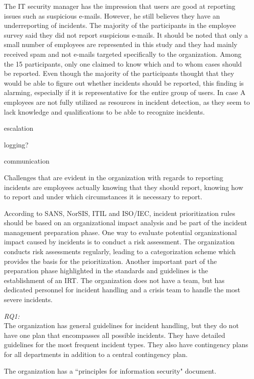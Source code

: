 The IT security manager has the impression that users are good at reporting issues such as suspicious e-mails. However, he still believes they have an underreporting of incidents. The majority of the participants in the employee survey said they did not report suspicious e-mails. It should be noted that only a small number of employees are represented in this study and they had mainly received spam and not e-mails targeted specifically to the organization. Among the 15 participants, only one claimed to know which and to whom cases should be reported. Even though the majority of the participants thought that they would be able to figure out whether incidents should be reported, this finding is alarming, especially if it is representative for the entire group of users. In case A employees are not fully utilized as resources in incident detection, as they seem to lack knowledge and qualifications to be able to recognize incidents.

escalation

logging?

communication

Challenges that are evident in the organization with regards to reporting incidents are employees actually knowing that they should report, knowing how to report and under which circumstances it is necessary to report.

According to SANS, NorSIS, ITIL and ISO/IEC, incident prioritization rules should be based on an organizational impact analysis and be part of the incident management preparation phase. One way to evaluate potential organizational impact caused by incidents is to conduct a risk assessment. The organization conducts risk assessments regularly, leading to a categorization scheme which provides the basis for the prioritization. Another important part of the preparation phase highlighted in the standards and guidelines is the establishment of an \ac{IRT}. The organization does not have a team, but has dedicated personnel for incident handling and a crisis team to handle the most severe incidents.

\textit{RQ1:}\\
The organization has general guidelines for incident handling, but they do not have one plan that encompasses all possible incidents. They have detailed guidelines for the most frequent incident types. They also have contingency plans for all departments in addition to a central contingency plan. 

The organization has a ``principles for information security" document.


